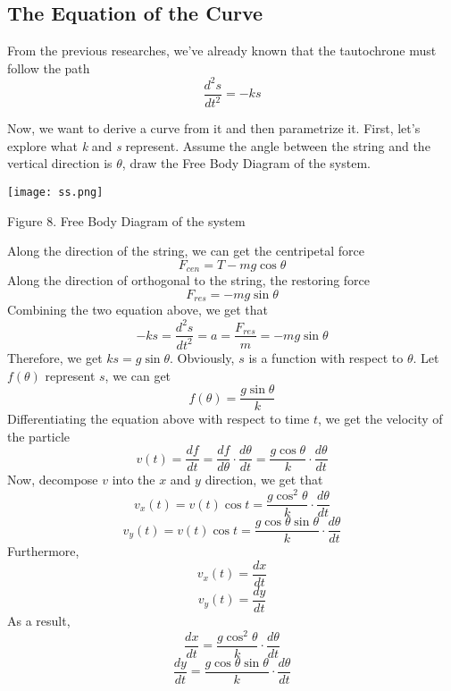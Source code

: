\documentclass{article}
\begin{document}
\subsection{The Equation of the Curve}
From the previous researches, we've already known that the tautochrone must follow the path
    \begin{equation*}
	\frac{d^{2}s}{dt^{2}}=-ks\label{con:sss}
	\end{equation*}
\par Now, we want to derive a curve from it and then parametrize it. First, let's explore what \emph{k} and \emph{s} represent. Assume the angle between the string and the vertical direction is $\theta$, draw the Free Body Diagram of the system.
\newline
\centerline{\texttt{[image: ss.png]}}
\newline
\centerline{Figure 8. Free Body Diagram of the system}
\newline
Along the direction of the string, we can get the centripetal force
    $$
    F_{cen}=T-mg\cos\theta
    $$
Along the direction of orthogonal to the string, the restoring force
    \begin{equation*}
    F_{res}=-mg\sin\theta\label{1}
    \end{equation*}
Combining the two equation above, we get that
    \begin{equation*}
    -ks=\frac{d^{2}s}{dt^{2}}=a=\frac{F_{res}}{m}=-mg\sin\theta\label{2}
    \end{equation*}
Therefore, we get $ks=g\sin\theta$. Obviously, $s$ is a function with respect to $\theta$. Let $f(\theta)$ represent $s$, we can get
    \begin{equation*}
    f(\theta)=\frac{g\sin\theta}{k}\label{3}
    \end{equation*}
Differentiating the equation above with respect to time $t$, we get the velocity of the particle
    \begin{equation*}
    v(t)=\frac{df}{dt}=\frac{df}{d\theta}\cdot\frac{d\theta}{dt}=\frac{g\cos\theta}{k}\cdot\frac{d\theta}{dt}\label{vt}
    \end{equation*}
Now, decompose $v$ into the $x$ and $y$ direction, we get that
    $$
    v_x(t)=v(t)\cos{t}=\frac{g\cos^{2}\theta}{k}\cdot\frac{d\theta}{dt}
    $$
    $$
    v_y(t)=v(t)\cos{t}=\frac{g\cos\theta \sin\theta}{k}\cdot\frac{d\theta}{dt}
    $$
Furthermore, $$v_x(t)=\frac{dx}{dt}$$ $$v_y(t)=\frac{dy}{dt}$$
As a result, $$\frac{dx}{dt}=\frac{g\cos^{2}\theta}{k}\cdot\frac{d\theta}{dt}$$
$$\frac{dy}{dt}=\frac{g\cos\theta \sin\theta}{k}\cdot\frac{d\theta}{dt}$$
\end{document}
